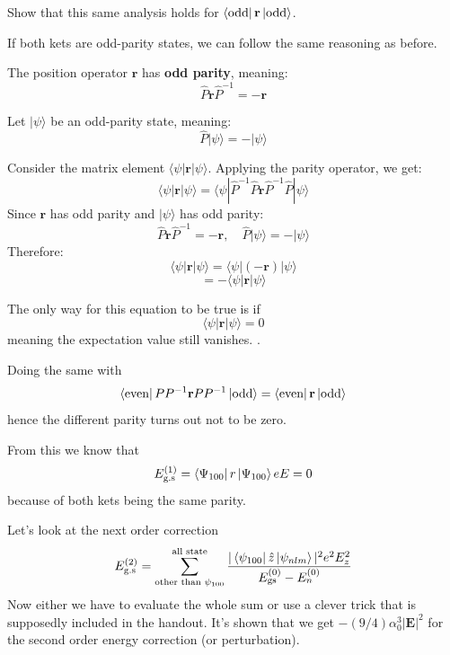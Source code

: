 \documentclass[10pt]{article}
\renewcommand{\vec}{\mathbf}
\renewcommand{\vec}{\mathbf}
\begin{document}
\begin{prob}
	Show that this same analysis holds for $\bra{\text{odd}} \vec{r} \ket{\text{odd}}$.
\end{prob}
\begin{solu}
	\begin{small}
		If both kets are odd-parity states, we can follow the same reasoning as before.

   The position operator \( \mathbf{r} \) has \textbf{odd parity}, meaning:  
   \[
   \hat{P} \mathbf{r} \hat{P}^{-1} = -\mathbf{r}
   \]

   Let \( | \psi \rangle \) be an odd-parity state, meaning:  
   \[
   \hat{P} | \psi \rangle = -| \psi \rangle
   \]

   Consider the matrix element \( \langle \psi | \mathbf{r} | \psi \rangle \). Applying the parity operator, we get:  
   \[
   \langle \psi | \mathbf{r} | \psi \rangle = \langle \psi | \hat{P}^{-1} \hat{P} \mathbf{r} \hat{P}^{-1} \hat{P} | \psi \rangle
   \]
   Since \( \mathbf{r} \) has odd parity and \( | \psi \rangle \) has odd parity:  
   \[
   \hat{P} \mathbf{r} \hat{P}^{-1} = -\mathbf{r}, \quad \hat{P} | \psi \rangle = -| \psi \rangle
   \]
   Therefore:  
   \[
   \langle \psi | \mathbf{r} | \psi \rangle = \langle \psi | (-\mathbf{r}) | \psi \rangle
   \]
   \[
   = -\langle \psi | \mathbf{r} | \psi \rangle
   \]

   The only way for this equation to be true is if  
   \[
   \langle \psi | \mathbf{r} | \psi \rangle = 0
   \]
   meaning the expectation value still vanishes. \qedsymbol.
	\end{small}
\end{solu}

Doing the same with \[
\bra{\text{even}} P P^{-1} \vec{r} P  P^{-1} \ket{\text{odd}} = \bra{\text{even}} \vec{r} \ket{\text{odd}} 
\] hence the different parity turns out not to be zero. 

From this we know that 
\[
	E^{(1)}_{\text{g.s}} = 
	\bra{\Psi_{100} } r \ket{\Psi_{100}} e E =0 
\] 
because of both kets being the same parity. 

Let's look at the next order correction 
\[
	E_\text{g.s}^{(2)} = \sum_{\text{other than } \psi_{100}}^{\text{all state}} 
	\frac{
		| \bra{\psi_{100}} \hat{z} \ket{\psi_{nlm}} | ^2 e ^2 E_z^2 
	}{E_{\text{gs}}^{(0)} - E_{n}^{(0)}}
\] 
Now either we have to evaluate the whole sum or use a clever trick that is supposedly included in the handout. It's shown that we get $- ( 9 / 4) \alpha_0^3 |\vec{E}|^2$ for the second order energy correction (or perturbation).  
\end{document}
